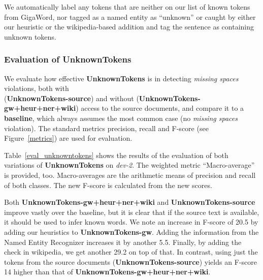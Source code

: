 \documentclass[a4paper,10pt]{scrartcl}
\theoremstyle{style}
\begin{document}
We automatically label any tokens that are neither on our list of known tokens from GigaWord, nor tagged as a named entity as ``unknown'' or caught by either our heuristic or the wikipedia-based addition and tag the sentence as containing unknown tokens.

\subsubsection{Evaluation of UnknownTokens}
We evaluate how effective \textbf{UnknownTokens} is in detecting \textit{missing spaces} violations, both with\\ (\textbf{UnknownTokens-source}) and without (\textbf{UnknownTokens-gw+heur+ner+wiki}) access to the source documents, and compare it to a \textbf{baseline}, which always assumes the most common case (no \textit{missing spaces} violation).
The standard metrics precision, recall and F-score (see Figure~\ref{metrics}) are used for evaluation.

Table~\ref{eval_unknowntokens} shows the results of the evaluation of both variations of \textbf{UnknownTokens} on \textit{dev-2}. The weighted metric ``Macro-average'' is provided, too.
Macro-averages are the arithmetic means of precision and recall of both classes. The new F-score is calculated from the new scores.

Both \textbf{UnknownTokens-gw+heur+ner+wiki} and \textbf{UnknownTokens-source} improve vastly over the baseline, but it is clear that if the source text is available, it should be used to infer known words. We note an increase in F-score of 20.5 by adding our heuristics to \textbf{UnknownTokens-gw}. Adding the information from the Named Entity Recognizer increases it by another 5.5. Finally, by adding the check in wikipedia, we get another 29.2 on top of that.
In contrast, using just the tokens from the source documents (\textbf{UnknownTokens-source}) yields an F-score 14 higher than that of \textbf{UnknownTokens-gw+heur+ner+wiki}.
\end{document}

